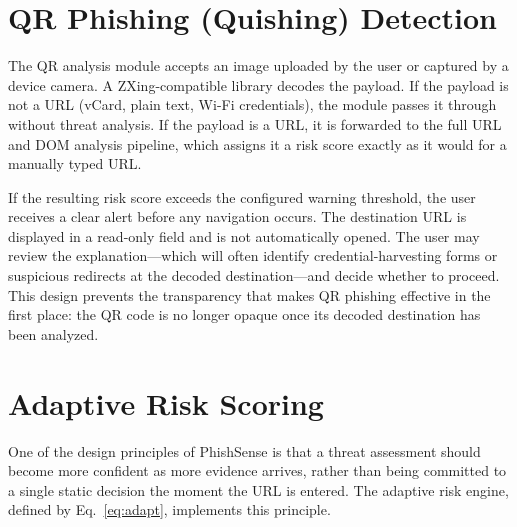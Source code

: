 \documentclass[conference]{IEEEtran}
\begin{document}
\section{QR Phishing (Quishing) Detection}

The QR analysis module accepts an image uploaded by the user or captured by a device camera.
A ZXing-compatible library decodes the payload.
If the payload is not a URL (vCard, plain text, Wi-Fi credentials), the module passes it through
without threat analysis.
If the payload is a URL, it is forwarded to the full URL and DOM analysis pipeline, which assigns
it a risk score exactly as it would for a manually typed URL.

If the resulting risk score exceeds the configured warning threshold, the user receives a clear
alert before any navigation occurs.
The destination URL is displayed in a read-only field and is not automatically opened.
The user may review the explanation---which will often identify credential-harvesting forms or
suspicious redirects at the decoded destination---and decide whether to proceed.
This design prevents the transparency that makes QR phishing effective in the first place:
the QR code is no longer opaque once its decoded destination has been analyzed.

\section{Adaptive Risk Scoring}

One of the design principles of PhishSense is that a threat assessment should become more
confident as more evidence arrives, rather than being committed to a single static decision
the moment the URL is entered.
The adaptive risk engine, defined by Eq.~\eqref{eq:adapt}, implements this principle.
\end{document}

